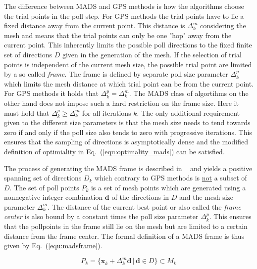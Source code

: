 \documentclass[a4paper,10pt]{article}
\renewcommand{\vec}[1]{\mathbf{#1}}
\newcommand{\equref}[1]{Eq.~(\ref{#1})}
\begin{document}
    The difference between MADS and GPS methods is how the algorithms choose
    the trial points in the poll step.
    For GPS methods the trial points have to lie a fixed distance away from
    the current point.
    This distance is $\Delta^m_k$ considering the mesh and means that
    the trial points can only be one "hop" away from the current point.
    This inherently limits the possible poll directions to the fixed finite
    set of directions $D$ given in the generation of the mesh.
    If the selection of trial points is independent of the current mesh
    size, the possible trial point are limited by a so called \emph{frame}.
    The frame is defined by separate poll size parameter $\Delta^p_k$
    which limits the mesh distance at which trial point can be from
    the current point.
    For GPS methods it holds that $\Delta^p_k = \Delta^m_k$.
    The MADS class of algortihms on the other hand does not impose such
    a hard restriction on the frame size.
    Here it must hold that $\Delta^p_k \geq \Delta^m_k$ for all iterations $k$.
    The only additional requirement given to the different size parameters is
    that the mesh size needs to tend towards zero if and only if the 
    poll size also tends to zero with progressive iterations.
    This ensures that the sampling of directions is asymptotically dense
    and the modified definition of optimiality in \equref{equ:optimality_mads}
    can be satisfied. 
    
    The process of generating the MADS frame is described in ~\cite{mads_original}
    and yields a positive spanning set of directions $D_k$ which contrary to
    GPS methods is \underline{not} a subset of $D$.
    The set of poll points $P_k$ is a set of mesh points which are generated
    using a nonnegative integer combination $\vec{d}$ of the directions in $D$
    and the mesh size parameter $\Delta^m_k$.
    The distance of the current best point or also called the \emph{frame center}
    is also bound by a constant times the poll size parameter $\Delta^p_k$.
    This ensures that the pollpoints in the frame still lie on the mesh
    but are limited to a certain distance from the frame center.
    The formal definition of a MADS frame is thus given by \equref{equ:madsframe}.

    \begin{equation}
        \label{equ:madsframe}
        P_k = \{\vec{x}_k + \Delta^m_k \vec{d} \, | \, \vec{d} \in D\} \subset M_k
    \end{equation}
\end{document}
